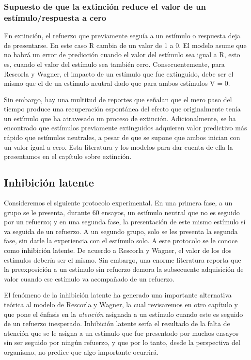 \documentclass[
  a4paper,
  DIV=11,
  numbers=noendperiod]{scrreprt}
\begin{document}
\subsubsection{Supuesto de que la extinción reduce el valor de un
estímulo/respuesta a
cero}\label{supuesto-de-que-la-extinciuxf3n-reduce-el-valor-de-un-estuxedmulorespuesta-a-cero}

En extinción, el refuerzo que previamente seguía a un estímulo o
respuesta deja de presentarse. En este caso R cambia de un valor de 1 a
0. El modelo asume que no habrá un error de predicción cuando el valor
del estímulo sea igual a R, esto es, cuando el valor del estímulo sea
también cero. Consecuentemente, para Rescorla y Wagner, el impacto de un
estímulo que fue extinguido, debe ser el mismo que el de un estímulo
neutral dado que para ambos estímulos V = 0.

Sin embargo, hay una multitud de reportes que señalan que el mero paso
del tiempo produce una recuperación espontánea del efecto que
originalmente tenía un estímulo que ha atravesado un proceso de
extinción. Adicionalmente, se ha encontrado que estímulos previamente
extinguidos adquieren valor predictivo más rápido que estímulos
neutrales, a pesar de que se supone que ambos inician con un valor igual
a cero. Esta literatura y los modelos para dar cuenta de ella la
presentamos en el capítulo sobre extinción.

\subsection{Inhibición latente}\label{inhibiciuxf3n-latente}

Consideremos el siguiente protocolo experimental. En una primera fase, a
un grupo se le presenta, durante 60 ensayos, un estímulo neutral que no
es seguido por un refuerzo; y en una segunda fase, la presentación de
este mismo estímulo sí va seguida de un refuerzo. A un segundo grupo,
solo se les presenta la segunda fase, sin darle la experiencia con el
estímulo solo. A este protocolo se le conoce como inhibición latente. De
acuerdo a Rescorla y Wagner, el valor de los dos estímulos debería ser
el mismo. Sin embargo, una enorme literatura reporta que la
preexposición a un estímulo sin refuerzo demora la subsecuente
adquisición de valor cuando ese estímulo va acompañado de un refuerzo.

El fenómeno de la inhibición latente ha generado una importante
alternativa teórica al modelo de Rescorla y Wagner, la cual revisaremos
en otro capítulo y que pone el énfasis en la \emph{atención} asignada a
un estímulo cuando este es seguido de un refuerzo inesperado. Inhibición
latente sería el resultado de la falta de atención que se le asigna a un
estímulo que fue presentado por muchos ensayos sin ser seguido por
ningún refuerzo, y que por lo tanto, desde la perspectiva del organismo,
no predice que algo importante ocurrirá.
\end{document}
